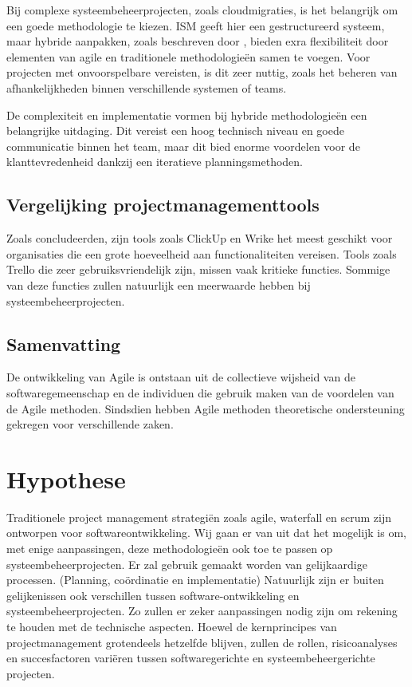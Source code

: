 \documentclass{article}
\begin{document}
    Bij complexe systeembeheerprojecten, zoals cloudmigraties, is het belangrijk om een goede methodologie te kiezen. 
    ISM geeft hier een gestructureerd systeem, maar hybride aanpakken, zoals beschreven door \textcite{reiff2022hybrid}, 
    bieden exra flexibiliteit door elementen van agile en traditionele methodologieën samen te voegen.
    Voor projecten met onvoorspelbare vereisten, is dit zeer nuttig, zoals het beheren van afhankelijkheden binnen verschillende systemen of teams. \autocite{reiff2022hybrid}

    De complexiteit en implementatie vormen bij hybride methodologieën een belangrijke uitdaging.
    Dit vereist een hoog technisch niveau en goede communicatie binnen het team, maar dit bied enorme voordelen voor de klanttevredenheid dankzij een iteratieve planningsmethoden. \autocite{reiff2022hybrid}

    \subsection{Vergelijking projectmanagementtools}

    Zoals \textcite{pasaric2022comparison} concludeerden, zijn tools zoals ClickUp en Wrike het meest geschikt voor organisaties die een grote hoeveelheid aan functionaliteiten vereisen. 
    Tools zoals Trello die zeer gebruiksvriendelijk zijn, missen vaak kritieke functies. 
    Sommige van deze functies zullen natuurlijk een meerwaarde hebben bij systeembeheerprojecten.

    \subsection{Samenvatting}

    De ontwikkeling van Agile is ontstaan uit de collectieve wijsheid van de softwaregemeenschap en de individuen die gebruik maken van de voordelen van de Agile methoden. 
    Sindsdien hebben Agile methoden theoretische ondersteuning gekregen voor verschillende zaken. \autocite{STRAY2022107058}

    \section{Hypothese}

    Traditionele project management strategiën zoals agile, waterfall en scrum zijn ontworpen voor softwareontwikkeling. 
    Wij gaan er van uit dat het mogelijk is om, met enige aanpassingen, deze methodologieën ook toe te passen op systeembeheerprojecten.
    Er zal gebruik gemaakt worden van gelijkaardige processen. (Planning, coördinatie en implementatie)
    Natuurlijk zijn er buiten gelijkenissen ook verschillen tussen software-ontwikkeling en systeembeheerprojecten. \newline
    Zo zullen er zeker aanpassingen nodig zijn om rekening te houden met de technische aspecten.
    Hoewel de kernprincipes van projectmanagement grotendeels hetzelfde blijven, zullen de rollen, risicoanalyses en 
    succesfactoren variëren tussen softwaregerichte en systeembeheergerichte projecten.
\end{document}
